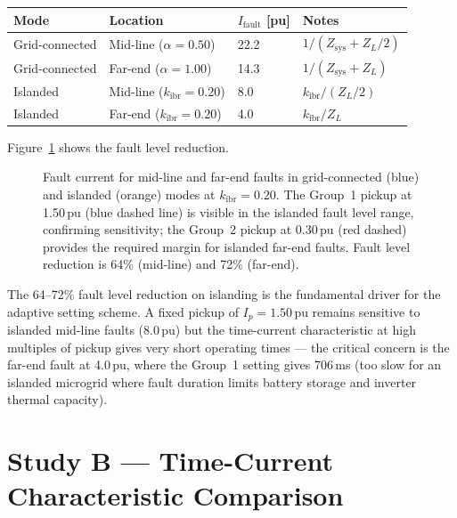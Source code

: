 \documentclass[11pt,a4paper]{article}
\begin{document}
\begin{center}
\begin{tabular}{@{}llll@{}}
\toprule
Mode & Location & $I_\mathrm{fault}$ [pu] & Notes \\
\midrule
Grid-connected & Mid-line ($\alpha=0.50$) & 22.2 & $1/(Z_\mathrm{sys}+Z_L/2)$ \\
Grid-connected & Far-end ($\alpha=1.00$)  & 14.3 & $1/(Z_\mathrm{sys}+Z_L)$ \\
Islanded & Mid-line ($k_\mathrm{ibr}=0.20$) & 8.0 & $k_\mathrm{ibr}/(Z_L/2)$ \\
Islanded & Far-end ($k_\mathrm{ibr}=0.20$)  & 4.0 & $k_\mathrm{ibr}/Z_L$ \\
\bottomrule
\end{tabular}
\end{center}

Figure~\ref{fig:faultlevels} shows the fault level reduction.

\begin{figure}[htbp]
  \centering
  \resizebox{0.86\textwidth}{!}{}
  \caption{Fault current for mid-line and far-end faults in grid-connected
           (blue) and islanded (orange) modes at $k_\mathrm{ibr}=0.20$.
           The Group~1 pickup at 1.50\,pu (blue dashed line) is visible in the
           islanded fault level range, confirming sensitivity; the Group~2
           pickup at 0.30\,pu (red dashed) provides the required margin for
           islanded far-end faults.  Fault level reduction is 64\% (mid-line)
           and 72\% (far-end).}
  \label{fig:faultlevels}
\end{figure}

\medskip\noindent
The 64--72\% fault level reduction on islanding is the fundamental driver for
the adaptive setting scheme.  A fixed pickup of $I_{p}=1.50$\,pu remains
sensitive to islanded mid-line faults (8.0\,pu) but the time-current
characteristic at high multiples of pickup gives very short operating times
--- the critical concern is the far-end fault at 4.0\,pu, where the Group~1
setting gives 706\,ms (too slow for an islanded microgrid where fault duration
limits battery storage and inverter thermal capacity).

\section{Study B --- Time-Current Characteristic Comparison}
\label{sec:studyB}
\end{document}
